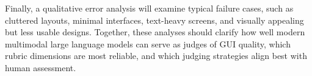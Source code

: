 \documentclass[pdflatex,sn-mathphys-num]{sn-jnl}
\begin{document}
Finally, a qualitative error analysis will examine typical failure cases, such as
cluttered layouts, minimal interfaces, text-heavy screens, and visually appealing but
less usable designs. Together, these analyses should clarify how well modern
multimodal large language models can serve as judges of GUI quality, which rubric
dimensions are most reliable, and which judging strategies align best with human
assessment.

\backmatter

{\footnotesize\setlength{\bibsep}{0pt}}
\end{document}
